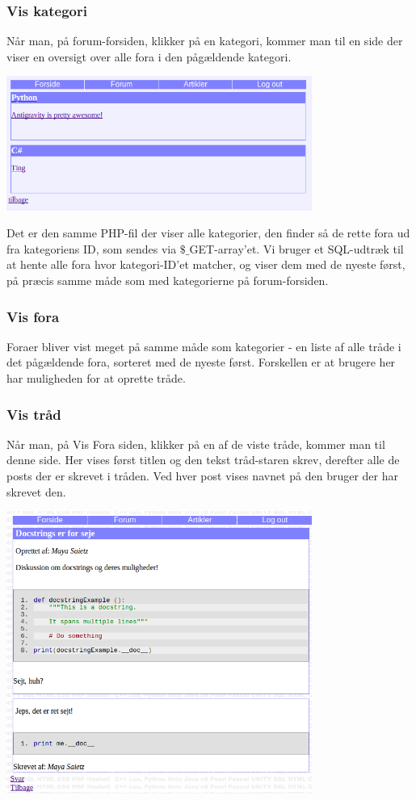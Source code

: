 \documentclass{article}
\begin{document}
\subsubsection{Vis kategori}
Når man, på forum-forsiden, klikker på en kategori, kommer man til en side der viser en oversigt over alle fora i den pågældende kategori. 

\includegraphics[width=100mm]{mi11.png}

Det er den samme PHP-fil der viser alle kategorier, den finder så de rette fora ud fra kategoriens ID, som sendes via $\$\_$GET-array'et. Vi bruger et SQL-udtræk til at hente alle fora hvor kategori-ID'et matcher, og viser dem med de nyeste først, på præcis samme måde som med kategorierne på forum-forsiden.

\subsubsection{Vis fora}
Foraer bliver vist meget på samme måde som kategorier - en liste af alle tråde i det pågældende fora, sorteret med de nyeste først. Forskellen er at brugere her har muligheden for at oprette tråde.

\subsubsection{Vis tråd}
Når man, på Vis Fora siden, klikker på en af de viste tråde, kommer man til denne side. Her vises først titlen og den tekst tråd-staren skrev, derefter alle de posts der er skrevet i tråden. Ved hver post vises navnet på den bruger der har skrevet den.

\includegraphics[width=100mm]{mi12.png}
\end{document}
